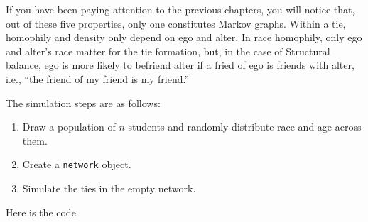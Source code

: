 \documentclass[]{book}
\newenvironment{Shaded}{\begin{snugshade}}{\end{snugshade}}
\newcommand{\CommentTok}[1]{\textcolor[rgb]{0.56,0.35,0.01}{\textit{#1}}}
\newcommand{\DataTypeTok}[1]{\textcolor[rgb]{0.13,0.29,0.53}{#1}}
\newcommand{\DecValTok}[1]{\textcolor[rgb]{0.00,0.00,0.81}{#1}}
\newcommand{\FloatTok}[1]{\textcolor[rgb]{0.00,0.00,0.81}{#1}}
\newcommand{\KeywordTok}[1]{\textcolor[rgb]{0.13,0.29,0.53}{\textbf{#1}}}
\newcommand{\NormalTok}[1]{#1}
\newcommand{\OperatorTok}[1]{\textcolor[rgb]{0.81,0.36,0.00}{\textbf{#1}}}
\newcommand{\OtherTok}[1]{\textcolor[rgb]{0.56,0.35,0.01}{#1}}
\newcommand{\StringTok}[1]{\textcolor[rgb]{0.31,0.60,0.02}{#1}}
\begin{document}
If you have been paying attention to the previous chapters, you will notice that,
out of these five properties, only one constitutes Markov graphs. Within a tie,
homophily and density only depend on ego and alter. In race homophily, only ego
and alter's race matter for the tie formation, but, in the case of Structural
balance, ego is more likely to befriend alter if a fried of ego is friends with alter,
i.e., ``the friend of my friend is my friend.''

The simulation steps are as follows:

\begin{enumerate}
\def\labelenumi{\arabic{enumi}.}
\item
  Draw a population of \(n\) students and randomly distribute race and age across them.
\item
  Create a \texttt{network} object.
\item
  Simulate the ties in the empty network.
\end{enumerate}

Here is the code

\begin{Shaded}
\end{Shaded}
\end{document}
